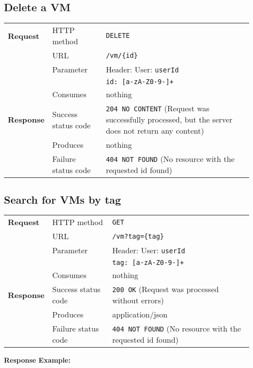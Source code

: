 \subsection{Delete a VM} %

\begin{center}
	\begin{tabularx}{\textwidth}{llX} 
	    \toprule
					\textbf{Request}        &   HTTP method             &   \texttt{DELETE}			\tabularnewline
		                        			&   URL                     &   \texttt{/vm/\{id\}}           	\tabularnewline
									& Parameter & Header: User: \texttt{userId} \tabularnewline
													& & \texttt{id: [a-zA-Z0-9-]+} \tabularnewline
                                  &   Consumes                &   nothing					      	\tabularnewline \midrule                       
          \textbf{Response}       &   Success status code     &   \texttt{204 NO CONTENT} (Request was successfully processed, but the server does not return any content) 	\tabularnewline
                                  &   Produces                &   nothing								\tabularnewline
                                  &   Failure status code     &   \texttt{404 NOT FOUND} (No resource with the requested id found)	\tabularnewline
           \bottomrule
	\end{tabularx}
\end{center}
\pagebreak[3] 	
\pagebreak[3]


\subsection{Search for VMs by tag} %

\begin{center}
	\begin{tabularx}{\textwidth}{llX} 
	    \toprule
					\textbf{Request}        &   HTTP method             &   \texttt{GET}			\tabularnewline
		                        			&   URL                     &   \texttt{/vm?tag=\{tag\}}           	\tabularnewline
									& Parameter & Header: User: \texttt{userId} \tabularnewline
													& & \texttt{tag: [a-zA-Z0-9-]+} \tabularnewline
                                  &   Consumes                &   nothing					      	\tabularnewline \midrule                       
          \textbf{Response}       &   Success status code     &   \texttt{200 OK} (Request was processed without errors) 	\tabularnewline
                                  &   Produces                &   application/json								\tabularnewline
                                  &   Failure status code     &   \texttt{404 NOT FOUND} (No resource with the requested id found)	\tabularnewline
           \bottomrule
	\end{tabularx}
\end{center}
\pagebreak[3] 	
\pagebreak[3]
		\textbf{Response Example:}
		


